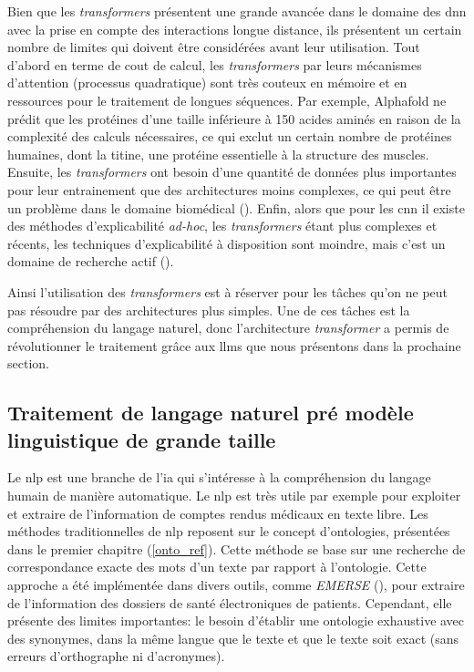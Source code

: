 Bien que les \textit{transformers} présentent une grande avancée dans le domaine des \gls{dnn} avec la prise en compte des interactions longue distance, ils présentent un certain nombre de limites qui doivent être considérées avant leur utilisation. Tout d'abord en terme de cout de calcul, les \textit{transformers} par leurs mécanismes d'attention (processus quadratique) sont très couteux en mémoire et en ressources pour le traitement de longues séquences. Par exemple, Alphafold ne prédit que les protéines d'une taille inférieure à 150 acides aminés en raison de la complexité des calculs nécessaires, ce qui exclut un certain nombre de protéines humaines, dont la titine, une protéine essentielle à la structure des muscles. Ensuite, les \textit{transformers} ont besoin d'une quantité de données plus importantes pour leur entrainement que des architectures moins complexes, ce qui peut être un problème dans le domaine biomédical (\cite{willemink_toward_2022}). Enfin, alors que pour les \gls{cnn} il existe des méthodes d'explicabilité \textit{ad-hoc}, les \textit{transformers} étant plus complexes et récents, les techniques d'explicabilité à disposition sont moindre, mais c'est un domaine de recherche actif (\cite{kim_can_2022, saha_explainability_2022}). 


Ainsi l'utilisation des \textit{transformers} est à réserver pour les tâches qu'on ne peut pas résoudre par des architectures plus simples. Une de ces tâches est la compréhension du langage naturel, donc l'architecture \textit{transformer} a permis de révolutionner le traitement grâce aux \gls{llms} que nous présentons dans la prochaine section.


\subsection{Traitement de langage naturel pré modèle linguistique de grande taille}
Le \gls{nlp} est une branche de l'\gls{ia} qui s'intéresse à la compréhension du langage humain de manière automatique. Le \gls{nlp} est très utile par exemple pour exploiter et extraire de l'information de comptes rendus médicaux en texte libre. Les méthodes traditionnelles de \gls{nlp} reposent sur le concept d'ontologies, présentées dans le premier chapitre (\ref{onto_ref}). Cette méthode se base sur une recherche de correspondance exacte des mots d'un texte par rapport à l'ontologie. Cette approche a été implémentée dans divers outils, comme \textit{EMERSE} (\cite{hanauer_supporting_2015}), pour extraire de l'information des dossiers de santé électroniques de patients. Cependant, elle présente des limites importantes: le besoin d'établir une ontologie exhaustive avec des synonymes, dans la même langue que le texte et que le texte soit exact (sans erreurs d'orthographe ni d'acronymes).


